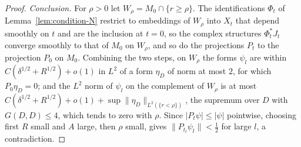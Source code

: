 \begin{proof}
\emph{Conclusion.} For $\rho>0$ let $W_\rho=M_0\cap\{r\ge\rho\}$. The
identifications $\Phi_{t}$ of Lemma~\ref{lem:condition-N} restrict to
embeddings of $W_\rho$ into $X_t$ that depend smoothly on $t$ and are the
inclusion at $t=0$, so the complex structures $\Phi_t^*J_t$ converge
smoothly to that of $M_0$ on $W_\rho$, and so do the projections
$P_t$ to the projection $P_0$ on $M_0$. Combining the two steps, on
$W_\rho$ the forms $\psi_l$ are within $C(\delta^{1/2}+R^{1/2})+o(1)$ in
$L^2$ of a form $\eta_D$ of norm at most $2$, for which $P_0\eta_D=0$;
and the $L^2$ norm of $\psi_l$ on the complement of $W_\rho$ is at most
$C(\delta^{1/2}+R^{1/2})+o(1)+\sup\|\eta_D\|_{L^2(\{r<\rho\})}$, the
supremum over $D$ with $G(D,D)\le4$, which tends to zero with $\rho$.
Since $|P_t\psi|\le|\psi|$ pointwise, choosing first $R$ small and $A$
large, then $\rho$ small, gives $\|P_{t_l}\psi_l\|<\tfrac12$ for large
$l$, a contradiction.
\end{proof}
